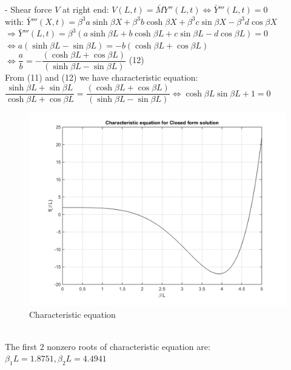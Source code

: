 \documentclass[14pt,a4paper]{article}
\begin{document}
\begin{enumerate}
	- Shear force $V$ at right end: $V(L,t) = \bar{M}Y''(L,t) \Leftrightarrow \bar{Y}'''(L,t) = 0$\\
	\hspace*{1.6cm} with: $ \bar{Y}'''(X,t) = \beta^3 a \sinh \beta X + \beta^3 b \cosh \beta X + \beta^3 c \sin \beta X - \beta^3 d \cos \beta X $\\
	\hspace*{1cm} $\Rightarrow \bar{Y}'''(L,t) = \beta^3 \left(a \sinh \beta L + b \cosh \beta L + c \sin \beta L - d \cos \beta L\right) = 0$ \\ 
	\hspace*{2.8cm} $\Leftrightarrow a(\sinh\beta L - \sin\beta L) = -b(\cosh\beta L + \cos\beta L)$\\
	\hspace*{2.8cm} $\Leftrightarrow \dfrac{a}{b} = -\dfrac{(\cosh\beta L + \cos\beta L)}{(\sinh\beta L - \sin\beta L)} $ \hspace{6.1cm} (12) \\
	From (11) and (12) we have characteristic equation:\\
	\hspace*{1cm} $ \dfrac{ \sinh\beta L + \sin \beta L}{\cosh \beta L + \cos \beta L} = \dfrac{(\cosh\beta L + \cos\beta L)}{(\sinh\beta L - \sin\beta L)} \Leftrightarrow \cosh\beta L \sin\beta L + 1 = 0 $\\
	\begin{figure}[htp]
		\centering
		\includegraphics[scale=0.5]{fn2_VB1_1.png}
		\caption{Characteristic equation}
	\end{figure}\\
	The first 2 nonzero roots of characteristic equation are: $\beta_1L = 1.8751, \beta_2L = 4.4941$\\

\end{enumerate}
\end{document}
